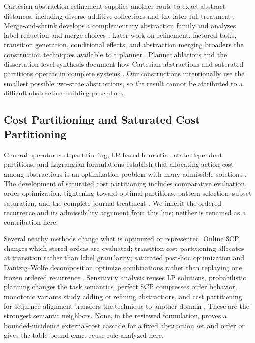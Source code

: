 Cartesian abstraction refinement supplies another route to exact abstract distances, including diverse additive collections and the later full treatment \citep{seipphelmert2013,seipphelmert2014,seipphelmert2018}. Merge-and-shrink develops a complementary abstraction family and analyzes label reduction and merge choices \citep{helmert2014,sievers2014,sievers2016}. Later work on refinement, factored tasks, transition generation, conditional effects, and abstraction merging broadens the construction techniques available to a planner \citep{speckseipp2022,abstractionfactored2024,cartesiantransitions2024,pozo2025,mergecartesian2025}. Planner ablations and the dissertation-level synthesis document how Cartesian abstractions and saturated partitions operate in complete systems \citep{seipp2024dissecting,seipp2018thesis}. Our constructions intentionally use the smallest possible two-state abstractions, so the result cannot be attributed to a difficult abstraction-building procedure.

\subsection{Cost Partitioning and Saturated Cost Partitioning}
General operator-cost partitioning, LP-based heuristics, state-dependent partitions, and Lagrangian formulations establish that allocating action cost among abstractions is an optimization problem with many admissible solutions \citep{fromnegative2015,lpbased2014,statedependent2016,lagrangian2019}. The development of saturated cost partitioning includes comparative evaluation, order optimization, tightening toward optimal partitions, pattern selection, subset saturation, and the complete journal treatment \citep{comparison2017,betterorders2017,narrowing2017,patternselection2019,subsetsaturated2019,scp2020}. We inherit the ordered recurrence and its admissibility argument from this line; neither is renamed as a contribution here.

Several nearby methods change what is optimized or represented. Online SCP changes which stored orders are evaluated; transition cost partitioning allocates at transition rather than label granularity; saturated post-hoc optimization and Dantzig--Wolfe decomposition optimize combinations rather than replaying one frozen ordered recurrence \citep{online2021,transitioncp2021,saturatedposthoc2021,dw2021}. Sensitivity analysis reuses LP solutions, probabilistic planning changes the task semantics, perfect SCP compresses order behavior, monotonic variants study adding or refining abstractions, and cost partitioning for sequence alignment transfers the technique to another domain \citep{sensitivity2023,probabilisticscp2023,sensitivity2024,perfect2025,monotonic2026,costpartitionmsa2024}. These are the strongest semantic neighbors. None, in the reviewed formulation, proves a bounded-incidence external-cost cascade for a fixed abstraction set and order or gives the table-bound exact-reuse rule analyzed here.

